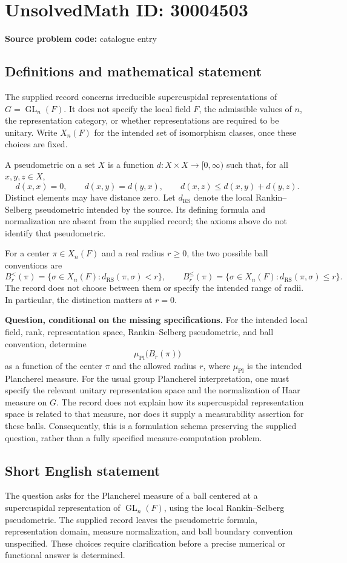 \documentclass[11pt]{article}
\begin{document}
\section*{UnsolvedMath ID: 30004503}
\textbf{Source problem code:} catalogue entry
\subsection{Definitions and mathematical statement}
The supplied record concerns irreducible supercuspidal representations of \(G=\operatorname{GL}_n(F)\). It does not specify the local field \(F\), the admissible values of \(n\), the representation category, or whether representations are required to be unitary. Write \(X_n(F)\) for the intended set of isomorphism classes, once these choices are fixed.

A pseudometric on a set \(X\) is a function \(d:X\times X\to[0,\infty)\) such that, for all \(x,y,z\in X\),
\[
d(x,x)=0,\qquad d(x,y)=d(y,x),\qquad d(x,z)\le d(x,y)+d(y,z).
\]
Distinct elements may have distance zero. Let \(d_{\mathrm{RS}}\) denote the local Rankin--Selberg pseudometric intended by the source. Its defining formula and normalization are absent from the supplied record; the axioms above do not identify that pseudometric.

For a center \(\pi\in X_n(F)\) and a real radius \(r\ge0\), the two possible ball conventions are
\[
B_r^{<}(\pi)=\{\sigma\in X_n(F):d_{\mathrm{RS}}(\pi,\sigma)<r\},
\qquad
B_r^{\le}(\pi)=\{\sigma\in X_n(F):d_{\mathrm{RS}}(\pi,\sigma)\le r\}.
\]
The record does not choose between them or specify the intended range of radii. In particular, the distinction matters at \(r=0\).

\textbf{Question, conditional on the missing specifications.} For the intended local field, rank, representation space, Rankin--Selberg pseudometric, and ball convention, determine
\[
\mu_{\mathrm{Pl}}\bigl(B_r(\pi)\bigr)
\]
as a function of the center \(\pi\) and the allowed radius \(r\), where \(\mu_{\mathrm{Pl}}\) is the intended Plancherel measure. For the usual group Plancherel interpretation, one must specify the relevant unitary representation space and the normalization of Haar measure on \(G\). The record does not explain how its supercuspidal representation space is related to that measure, nor does it supply a measurability assertion for these balls. Consequently, this is a formulation schema preserving the supplied question, rather than a fully specified measure-computation problem.
\subsection{Short English statement}
The question asks for the Plancherel measure of a ball centered at a supercuspidal representation of \(\operatorname{GL}_n(F)\), using the local Rankin--Selberg pseudometric. The supplied record leaves the pseudometric formula, representation domain, measure normalization, and ball boundary convention unspecified. These choices require clarification before a precise numerical or functional answer is determined.
\end{document}
